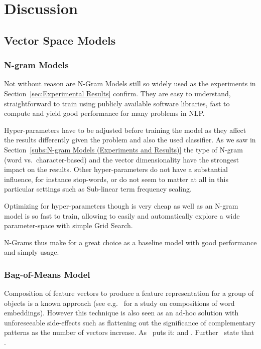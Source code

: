 
\clearpage

\section{Discussion}
\label{sec:Discussion}


\subsection{Vector Space Models}
\label{sub:Vector Space Models (Discussion)}

\subsubsection{N-gram Models}

Not without reason are N-Gram Models still so widely used as the experiments in Section~\ref{sec:Experimental Results} confirm. They are easy to understand, straightforward to train using publicly available software libraries, fast to compute and yield good performance for many problems in \gls{NLP}.

Hyper-parameters have to be adjusted before training the model as they affect the results differently given the problem and also the used classifier. As we saw in Section~\ref{subs:N-gram Models (Experiments and Results)} the type of N-gram (word vs.\ character-based) and the vector dimensionality have the strongest impact on the results. Other hyper-parameters do not have a substantial influence, for instance stop-words, or do not seem to matter at all in this particular settings such as Sub-linear term frequency scaling.

Optimizing for hyper-parameters though is very cheap as well as an N-gram model is so fast to train, allowing to easily and automatically explore a wide parameter-space with simple \gls{Grid Search}.

N-Grams thus make for a great choice as a baseline model with good performance and simply usage.

\subsubsection{Bag-of-Means Model}

Composition of feature vectors to produce a feature representation for a group of objects is a known approach (see e.g.~\cite{Mitchell:2010aa} for a study on compositions of word embeddings). However this technique is also seen as an ad-hoc solution with unforeseeable side-effects such as flattening out the significance of complementary patterns as the number of vectors increase. As~\cite{Zhang:2015aa} puts it:  and . Further~\cite{Le:2014aa} state that .

